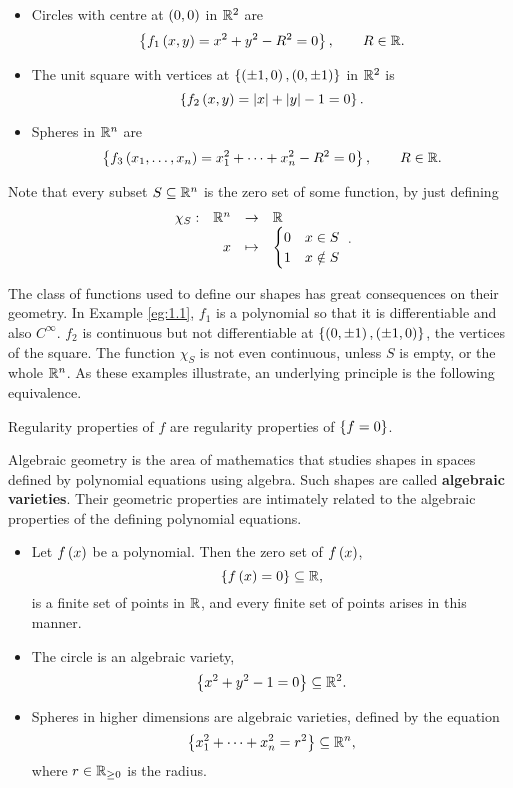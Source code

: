\begin{example}
\label{eg:1.1}
\hfill
\begin{itemize}
\item Circles with centre at $ \left( 0, 0 \right) $ in $ \mathbb{R}^2 $ are
$$ \left\{ f_1\left( x, y \right) = x^2 + y^2 - R^2 = 0 \right\}, \qquad R \in \mathbb{R}. $$
\item The unit square with vertices at $ \left\{ \left( \pm 1, 0 \right), \left( 0, \pm 1 \right) \right\} $ in $ \mathbb{R}^2 $ is
$$ \left\{ f_2\left( x, y \right) = \left\lvert x \right\rvert + \left\lvert y \right\rvert - 1 = 0 \right\}. $$
\item Spheres in $ \mathbb{R}^n $ are
$$ \left\{ f_3\left( x_1, \dots, x_n \right) = x_1^2 + \dots + x_n^2 - R^2 = 0 \right\}, \qquad R \in \mathbb{R}. $$
\end{itemize}
\end{example}

\begin{remark}
Note that every subset $ S \subseteq \mathbb{R}^n $ is the zero set of some function, by just defining
$$ \function[\chi_S]{\R^n}{\R}{x}{
\begin{cases}
0 & x \in S \\
1 & x \notin S
\end{cases}
}. $$
\end{remark}

The class of functions used to define our shapes has great consequences on their geometry. In Example \ref{eg:1.1}, $ f_1 $ is a polynomial so that it is differentiable and also $ C^\infty $. $ f_2 $ is continuous but not differentiable at $ \left\{ \left( 0, \pm 1 \right), \left( \pm 1, 0 \right) \right\} $, the vertices of the square. The function $ \chi_S $ is not even continuous, unless $ S $ is empty, or the whole $ \mathbb{R}^n $. As these examples illustrate, an underlying principle is the following equivalence.

\begin{fact*}
Regularity properties of $ f $ are regularity properties of $ \left\{ f = 0 \right\} $.
\end{fact*}

Algebraic geometry is the area of mathematics that studies shapes in spaces defined by polynomial equations using algebra. Such shapes are called \textbf{algebraic varieties}. Their geometric properties are intimately related to the algebraic properties of the defining polynomial equations.

\begin{example}
\hfill
\begin{itemize}
\item Let $ f\left( x \right) $ be a polynomial. Then the zero set of $ f\left( x \right) $,
$$ \left\{ f\left( x \right) = 0 \right\} \subseteq \mathbb{R}, $$
is a finite set of points in $ \mathbb{R} $, and every finite set of points arises in this manner.
\item The circle is an algebraic variety,
$$ \left\{ x^2 + y^2 - 1 = 0 \right\} \subseteq \mathbb{R}^2. $$
\item Spheres in higher dimensions are algebraic varieties, defined by the equation
$$ \left\{ x_1^2 + \dots + x_n^2 = r^2 \right\} \subseteq \mathbb{R}^n, $$
where $ r \in \mathbb{R}_{\ge 0} $ is the radius.
\end{itemize}
\end{example}

